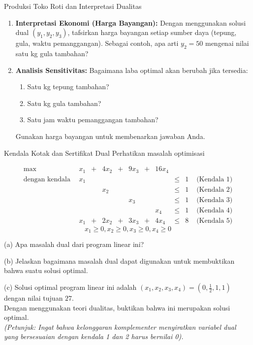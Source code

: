 \begin{ex}{Produksi Toko Roti dan Interpretasi Dualitas}{}
\begin{enumerate}
  \item \textbf{Interpretasi Ekonomi (Harga Bayangan):}
  Dengan menggunakan solusi dual $(y_1, y_2, y_3)$, tafsirkan harga bayangan setiap sumber daya (tepung, gula, waktu pemanggangan). Sebagai contoh, apa arti $y_2 = 50$ mengenai nilai satu kg gula tambahan?

  \item \textbf{Analisis Sensitivitas:}
  Bagaimana laba optimal akan berubah jika tersedia:
  \begin{enumerate}
    \item Satu kg tepung tambahan?
    \item Satu kg gula tambahan?
    \item Satu jam waktu pemanggangan tambahan?
  \end{enumerate}
  Gunakan harga bayangan untuk membenarkan jawaban Anda.
\end{enumerate}
\end{ex}

\begin{ex}{Kendala Kotak dan Sertifikat Dual}{}
\label{ex:cs-box-constraints}
 Perhatikan masalah optimisasi

\begin{equation*}
\begin{array}{rrrrrrrrrrrrrrrrr}
\max \ \ \ &   x_1 &+ &4 x_2 &+& 9x_3 &+& 16 x_4&\\
\text{dengan kendala} \ \
& x_1& &&&&&&\leq &1& \text{ (Kendala 1)}\\
&&& x_2 &&&&&\leq &1& \text{ (Kendala 2)}\\
&&&&& x_3&&& \leq &1& \text{ (Kendala 3)}\\
&&&&&&& x_4 &\leq &1& \text{ (Kendala 4)}\\
& x_1 &+& 2x_2& + &3x_3 &+& 4x_4 &\leq &8 & \text{ (Kendala 5)}
\end{array}
\end{equation*}
$$ x_1 \geq 0, x_2 \geq 0, x_3 \geq 0, x_4 \geq 0
$$

(a) Apa masalah dual dari program linear ini?

(b) Jelaskan bagaimana masalah dual dapat digunakan untuk membuktikan bahwa suatu solusi optimal.

(c) Solusi optimal program linear ini adalah $(x_1, x_2, x_3, x_4) = (0,\tfrac{1}{2},1,1)$ dengan nilai tujuan $27$. \\

Dengan menggunakan teori dualitas, buktikan bahwa ini merupakan solusi optimal. \\
\textit{(Petunjuk: Ingat bahwa kelonggaran komplementer menyiratkan variabel dual yang bersesuaian dengan kendala 1 dan 2 harus bernilai 0).}
\exrefs{Teorema~\ref{thm:weak-duality}, Teorema~\ref{thm:cs-optimality}}
\end{ex}

